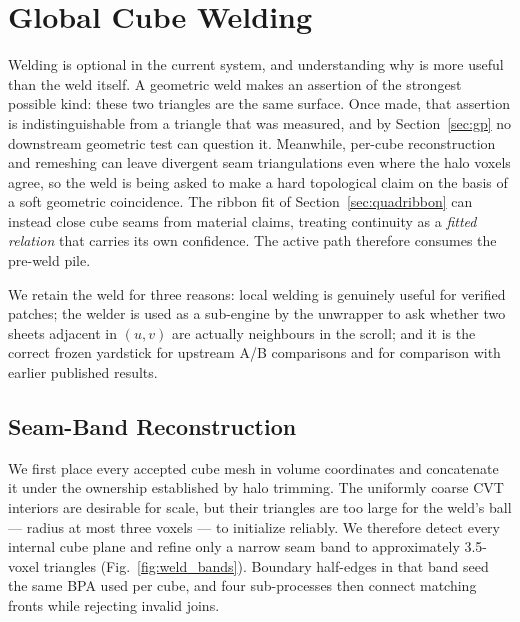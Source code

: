 \section{Global Cube Welding}
\label{sec:weld}


Welding is optional in the current system, and understanding why is more useful than the weld itself. A geometric weld makes an assertion of the strongest possible kind: these two triangles are the same surface. Once made, that assertion is indistinguishable from a triangle that was measured, and by Section~\ref{sec:gp} no downstream geometric test can question it. Meanwhile, per-cube reconstruction and remeshing can leave divergent seam triangulations even where the halo voxels agree, so the weld is being asked to make a hard topological claim on the basis of a soft geometric coincidence. The ribbon fit of Section~\ref{sec:quadribbon} can instead close cube seams from material claims, treating continuity as a \emph{fitted relation} that carries its own confidence. The active path therefore consumes the pre-weld pile.

We retain the weld for three reasons: local welding is genuinely useful for verified patches; the welder is used as a sub-engine by the unwrapper to ask whether two sheets adjacent in $(u,v)$ are actually neighbours in the scroll; and it is the correct frozen yardstick for upstream A/B comparisons and for comparison with earlier published results.

\subsection{Seam-Band Reconstruction}

We first place every accepted cube mesh in volume coordinates and concatenate it under the ownership established by halo trimming. The uniformly coarse CVT interiors are desirable for scale, but their triangles are too large for the weld's ball --- radius at most three voxels --- to initialize reliably. We therefore detect every internal cube plane and refine only a narrow seam band to approximately 3.5-voxel triangles (Fig.~\ref{fig:weld_bands}). Boundary half-edges in that band seed the same BPA used per cube, and four sub-processes then connect matching fronts while rejecting invalid joins.

